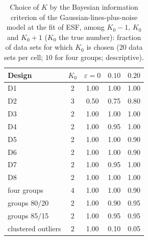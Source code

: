 \begin{table}[htbp]
\centering
\small
\caption{Choice of $K$ by the Bayesian information criterion of the Gaussian-lines-plus-noise model at the fit of ESF, among $K_0-1$, $K_0$ and $K_0+1$ ($K_0$ the true number): fraction of data sets for which $K_0$ is chosen ($20$ data sets per cell; $10$ for four groups; descriptive).}
\label{tab:S18}
\begin{tabular}{lcccc}
\toprule
Design & $K_0$ & $\varepsilon=0$ & $0.10$ & $0.20$ \\
\midrule
D1 & 2 & 1.00 & 1.00 & 1.00 \\
D2 & 3 & 0.50 & 0.75 & 0.80 \\
D3 & 2 & 1.00 & 1.00 & 1.00 \\
D4 & 2 & 1.00 & 0.95 & 1.00 \\
D5 & 2 & 1.00 & 1.00 & 0.90 \\
D6 & 2 & 1.00 & 1.00 & 0.90 \\
D7 & 2 & 1.00 & 0.95 & 1.00 \\
D8 & 2 & 1.00 & 1.00 & 1.00 \\
four groups & 4 & 1.00 & 1.00 & 0.90 \\
groups 80/20 & 2 & 1.00 & 0.90 & 0.95 \\
groups 85/15 & 2 & 1.00 & 0.95 & 0.95 \\
clustered outliers & 2 & 1.00 & 0.10 & 0.05 \\
\bottomrule
\end{tabular}
\end{table}
